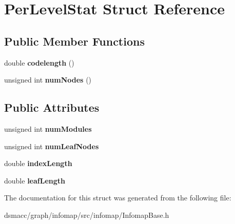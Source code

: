 \hypertarget{structPerLevelStat}{}\section{Per\+Level\+Stat Struct Reference}
\label{structPerLevelStat}
\subsection*{Public Member Functions}
\begin{DoxyCompactItemize}
\item 
\mbox{\label{structPerLevelStat_a9603cf1ba9f67c542a53106628144bda}} 
double {\bfseries codelength} ()
\item 
\mbox{\label{structPerLevelStat_a2e26778f84c65ac49b2f5a4c0316eb11}} 
unsigned int {\bfseries num\+Nodes} ()
\end{DoxyCompactItemize}
\subsection*{Public Attributes}
\begin{DoxyCompactItemize}
\item 
\mbox{\label{structPerLevelStat_a3a80f895192207e434bcda47838480aa}} 
unsigned int {\bfseries num\+Modules}
\item 
\mbox{\label{structPerLevelStat_ac999e1ada16d95d488218e3866105c18}} 
unsigned int {\bfseries num\+Leaf\+Nodes}
\item 
\mbox{\label{structPerLevelStat_a929211235ec24ade6ac58e78e5e08941}} 
double {\bfseries index\+Length}
\item 
\mbox{\label{structPerLevelStat_a9dc1c4a78683d51368c2decc232a509e}} 
double {\bfseries leaf\+Length}
\end{DoxyCompactItemize}


The documentation for this struct was generated from the following file\+:\begin{DoxyCompactItemize}
\item 
dsmacc/graph/infomap/src/infomap/Infomap\+Base.\+h\end{DoxyCompactItemize}
